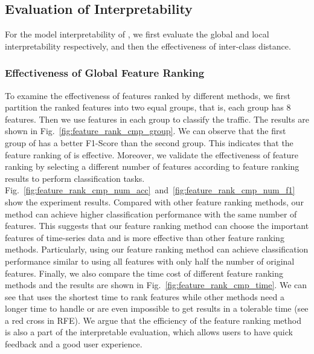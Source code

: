 \subsection{Evaluation of Interpretability}
For the model interpretability of \sys, we first evaluate the global and local interpretability respectively, and then the effectiveness of inter-class distance.
\subsubsection{Effectiveness of Global Feature Ranking}
To examine the effectiveness of features ranked by different methods, we first partition the ranked features into two equal groups, that is, each group has 8 features. 
Then we use features in each group to classify the traffic.
The results are shown in Fig.~\ref{fig:feature_rank_cmp_group}.
We can observe that the first group of \sys has a better F1-Score than the second group.
This indicates that the feature ranking of \sys is effective.
Moreover, we validate the effectiveness of feature ranking by selecting a different number of features according to feature ranking results to perform classification tasks. 
Fig.~\ref{fig:feature_rank_cmp_num_acc}~and~\ref{fig:feature_rank_cmp_num_f1} show the experiment results. 
Compared with other feature ranking methods, our method can achieve higher classification performance with the same number of features. 
This suggests that our feature ranking method can choose the important features of time-series data and is more effective than other feature ranking methods. 
Particularly, using our feature ranking method can achieve classification performance similar to using all features with only half the number of original features. 
Finally, we also compare the time cost of different feature ranking methods and the results are shown in Fig.~\ref{fig:feature_rank_cmp_time}.
We can see that \sys uses the shortest time to rank features while other methods need a longer time to handle or are even impossible to get results in a tolerable time (see a red cross in RFE).
We argue that the efficiency of the feature ranking method is also a part of the interpretable evaluation, which allows users to have quick feedback and a good user experience. 

